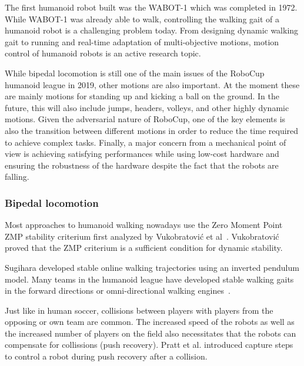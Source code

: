 \documentclass{article}
\begin{document}
The first humanoid robot built was the WABOT-1 which was completed in 1972. 
While WABOT-1 was already able to walk, controlling the walking gait of a humanoid robot is a challenging problem today.
From designing dynamic walking gait to running and real-time adaptation of multi-objective motions, motion control of humanoid robots is an active research topic.

While bipedal locomotion is still one of the main issues of the RoboCup humanoid
league in 2019, other motions are also important. 
At the moment these are mainly motions for standing up and kicking a ball on the ground.
In the future, this will also include jumps, headers, volleys, and other highly dynamic motions.
Given the adversarial nature of RoboCup, one of the key elements is also the transition between different motions in order to reduce the time required to achieve complex tasks. 
Finally, a major concern from a mechanical point of view is achieving satisfying performances while using low-cost hardware and ensuring the robustness of the hardware despite the fact that the robots are falling.

\subsubsection{Bipedal locomotion}


Most approaches to humanoid walking nowadays use the Zero Moment Point ZMP stability criterium first analyzed by Vukobratović et al~\cite{Vukobratovic2001}.
Vukobratović proved that the ZMP criterium is a sufficient condition for dynamic stability.

Sugihara developed stable online walking trajectories using an inverted pendulum model.
Many teams in the humanoid league have developed stable walking gaits in the forward directions or omni-directional walking engines~\cite{Sugihara2002}.

Just like in human soccer, collisions between players with players from the opposing or own team are common.
The increased speed of the robots as well as the increased number of players on the field also necessitates that the robots can compensate for collissions (push recovery).
Pratt et al. introduced capture steps to control a robot during push recovery after a collision\cite{Pratt2006}.
\end{document}
